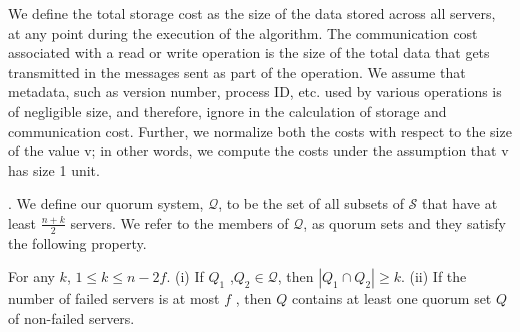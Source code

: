 We define the total storage cost as the size of the
data stored across all servers, at any point during the execution of the algorithm. The
communication cost associated with a read or write operation is the size of the total data that
gets transmitted in the messages sent as part of the operation. We assume that metadata,
such as version number, process ID, etc. used by various operations is of negligible size, and therefore,  ignore in the calculation of storage and communication cost. Further, we normalize
both the costs with respect to the size of the value v; in other words, we compute the costs
under the assumption that v has size 1 unit.

 
. We define our quorum system, $\mathcal{Q}$, to be the set of all subsets of $\mathcal{S}$ that have at least $\frac{n+k}{2}$ servers. We refer to the members of $\mathcal{Q}$, as quorum sets and they satisfy the following property.

\begin{lemma}
For any $k$,  $1 \leq k \leq n -2f$. (i) If $Q_1$ ,$Q_2 \in \mathcal{Q}$,
then $|Q_1 \cap Q_2 | \geq k$. (ii) If the number of failed servers is
at most $f$ , then $Q$ contains at least one quorum set $Q$ of
non-failed servers.
\end{lemma}

